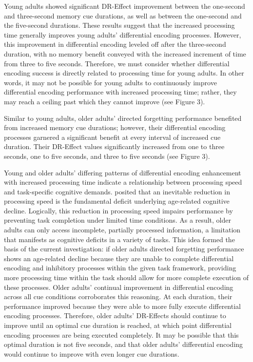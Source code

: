 \documentclass[man]{apa6}\usepackage[]{graphicx}\usepackage[]{color}
\begin{document}
Young adults showed significant DR-Effect improvement between the one-second and three-second memory cue durations, as well as between the one-second and the five-second durations. These results suggest that the increased processing time generally improves young adults’ differential encoding processes. However, this improvement in differential encoding leveled off after the three-second duration, with no memory benefit conveyed with the increased increment of time from three to five seconds. Therefore, we must consider whether differential encoding success is directly related to processing time for young adults. In other words, it may not be possible for young adults to continuously improve differential encoding performance with increased processing time; rather, they may reach a ceiling past which they cannot improve (see Figure 3).

Similar to young adults, older adults’ directed forgetting performance benefited from increased memory cue durations; however, their differential encoding processes garnered a significant benefit at every interval of increased cue duration. Their DR-Effect values significantly increased from one to three seconds, one to five seconds, and three to five seconds (see Figure 3).

Young and older adults’ differing patterns of differential encoding enhancement with increased processing time indicate a relationship between processing speed and task-specific cognitive demands. \textcite{salthouse1996} posited that an inevitable reduction in processing speed is the fundamental deficit underlying age-related cognitive decline. Logically, this reduction in processing speed impairs performance by preventing task completion under limited time conditions. As a result, older adults can only access incomplete, partially processed information, a limitation that manifests as cognitive deficits in a variety of tasks. This idea formed the basis of the current investigation: if older adults directed forgetting performance shows an age-related decline because they are unable to complete differential encoding and inhibitory processes within the given task framework, providing more processing time within the task should allow for more complete execution of these processes. Older adults’ continual improvement in differential encoding across all cue conditions corroborates this reasoning. At each duration, their performance improved because they were able to more fully execute differential encoding processes. Therefore, older adults’ DR-Effects should continue to improve until an optimal cue duration is reached, at which point differential encoding processes are being executed completely. It may be possible that this optimal duration is not five seconds, and that older adults’ differential encoding would continue to improve with even longer cue durations.
\end{document}
